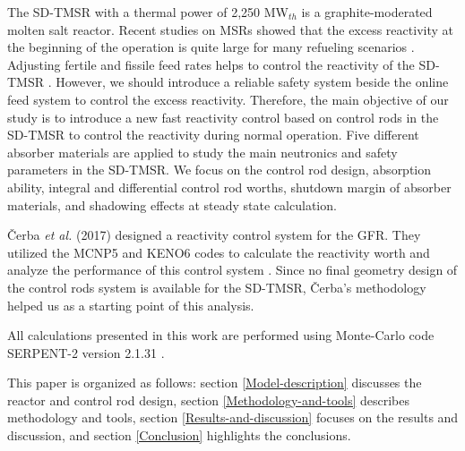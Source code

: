 The \gls{SD-TMSR} with a thermal power of 2,250 MW$_{th}$ 
\cite{ashraf2019whole_core,li_optimization_2018} is a graphite-moderated 
molten salt reactor. Recent studies on MSRs showed that the excess reactivity 
at the beginning of the operation is quite large for many refueling scenarios 
\cite{ashraf2019whole_core,rykhlevskii2019modeling,betzler2016modeling,ashraf2018nuclear,ashraf2019modeling}.
 Adjusting fertile and fissile feed rates helps to control the reactivity of 
the SD-TMSR \cite{ashraf2019whole_core}. However, we should introduce a 
reliable safety system beside the online feed system to control the excess 
reactivity. Therefore, the main objective of our study is to introduce a new 
fast reactivity control based on control rods in the \gls{SD-TMSR} to control 
the reactivity during normal operation. Five different absorber materials are 
applied to study the main neutronics and safety parameters in the SD-TMSR. We 
focus on the control rod design, absorption ability, integral and differential 
control rod worths, shutdown margin of absorber materials, and shadowing 
effects at steady state calculation.

\v{C}erba \emph{et al.} (2017) designed a reactivity control system for the 
GFR. They utilized the MCNP5 \cite{briesmeister2000mcnptm} and KENO6 codes 
\cite{petrie1984keno} to calculate the reactivity worth and analyze the 
performance of this control system \cite{vcerba2017optimization}. Since no 
final geometry design of the control rods system is available for the SD-TMSR, 
\v{C}erba's methodology \cite{vcerba2017optimization}  helped us as a starting 
point of this analysis.

All calculations presented in this work are performed using Monte-Carlo code SERPENT-2 version 2.1.31 \cite{leppanen2014serpent}.

This paper is organized as follows: section \ref{Model-description} discusses the reactor and control rod design, section \ref{Methodology-and-tools} describes methodology and tools, section \ref{Results-and-discussion} focuses on the results and discussion, and section \ref{Conclusion} highlights the conclusions.